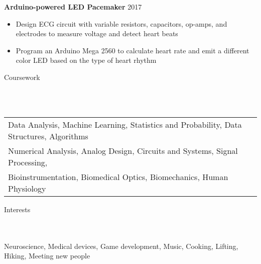 \documentclass[a4paper]{article}
\newcommand{\lineunder} {
    \vspace*{-8pt} \\
    \hspace*{-18pt} \hrulefill \\
}
\newcommand{\header} [1] {
    {\hspace*{-18pt}\vspace*{6pt} \Large{#1} }
    \vspace*{-6pt} 
    \lineunder
}
\begin{document}
\textbf{Arduino-powered LED Pacemaker} \hfill 2017
\vspace{-2mm}
\begin{itemize} \itemsep 0.1pt
	\item Design ECG circuit with variable resistors, capacitors, op-amps, and electrodes to measure voltage and detect heart beats
	\item Program an Arduino Mega 2560 to calculate heart rate and emit a different color LED based on the type of heart rhythm
\end{itemize}
\vspace*{2mm}

\header{Coursework}
\begin{tabular}{ l l }
	Data Analysis, Machine Learning, Statistics and Probability, Data Structures, Algorithms \\
	Numerical Analysis, Analog Design, Circuits and Systems, Signal Processing, \\
	Bioinstrumentation,
	Biomedical Optics, Biomechanics, Human Physiology
\end{tabular}
\vspace{2mm}

\header{Interests}
Neuroscience, Medical devices, Game development, Music, Cooking, Lifting, Hiking, Meeting new people
\ 
\end{document}
